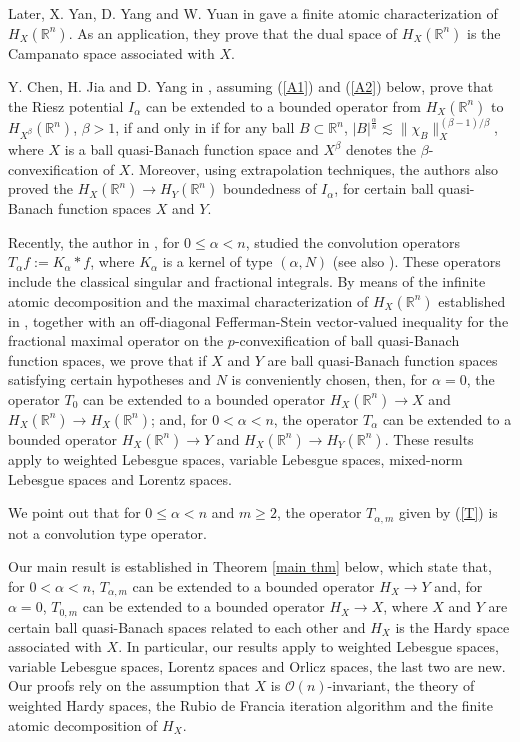 \documentclass[oneside,10pt]{article}
\begin{document}
Later, X. Yan, D. Yang and W. Yuan in \cite{Yan} gave a finite atomic characterization of $H_X(\mathbb{R}^n)$. As an
application, they prove that the dual space of $H_X(\mathbb{R}^n)$ is the Campanato space associated with $X$.


Y. Chen, H. Jia and D. Yang in \cite{YChen}, assuming (\ref{A1}) and (\ref{A2}) below, prove that the Riesz potential 
$I_{\alpha}$ can be extended to a bounded operator from $H_X(\mathbb{R}^n)$ to $H_{X^{\beta}}(\mathbb{R}^n)$, $\beta > 1$, if and only in  if 
for any ball $B \subset \mathbb{R}^n$, $|B|^{\frac{\alpha}{n}} \lesssim \| \chi_B \|_{X}^{(\beta-1)/\beta}$, where $X$ is a ball quasi-Banach function space and $X^{\beta}$ denotes the $\beta$-convexification of $X$. Moreover, using extrapolation techniques, the authors also proved the $H_X(\mathbb{R}^n) \to H_Y(\mathbb{R}^n)$ boundedness of $I_{\alpha}$, for certain ball quasi-Banach function spaces $X$ and $Y$.


Recently, the author in \cite{Rocha2025}, for $0 \leq \alpha < n$, studied the convolution operators $T_{\alpha}f := K_{\alpha} \ast f$, 
where $K_{\alpha}$ is a kernel of type $(\alpha, N)$ (see also \cite{Folland}). These operators include the classical singular and 
fractional integrals. By means of the infinite atomic decomposition and the maximal characterization of $H_X(\mathbb{R}^n)$ established in 
\cite{sawa}, together with an off-diagonal Fefferman-Stein vector-valued inequality for the fractional maximal operator on the 
$p$-convexification of ball quasi-Banach function spaces, we prove that if $X$ and $Y$ are ball quasi-Banach function spaces satisfying certain hypotheses and $N$ is conveniently chosen, then, for $\alpha = 0$, the operator $T_0$ can be extended to a bounded operator 
$H_{X}(\mathbb{R}^n) \to X$ and $H_{X}(\mathbb{R}^n) \to H_{X}(\mathbb{R}^n)$; and, for $0 < \alpha < n$, the operator $T_{\alpha}$ can 
be extended to a bounded operator $H_{X}(\mathbb{R}^n) \to Y$ and $H_{X}(\mathbb{R}^n) \to H_{Y}(\mathbb{R}^n)$. These results apply to weighted Lebesgue spaces, variable Lebesgue spaces, mixed-norm Lebesgue spaces and Lorentz spaces.
 

We point out that for $0 \leq \alpha < n$ and $m \geq 2$, the operator $T_{\alpha, m}$ given by (\ref{T}) is not a convolution type operator.


Our main result is established in Theorem \ref{main thm} below, which state that, for $0 < \alpha < n$, $T_{\alpha, m}$ can be extended to a bounded operator $H_X \to Y$ and, for $\alpha = 0$, $T_{0, m}$ can be extended to a bounded operator $H_X \to X$, where $X$ and $Y$ are certain ball quasi-Banach spaces related to each other and $H_X$ is the Hardy space associated with $X$. In particular, our results apply to weighted Lebesgue spaces, variable Lebesgue spaces, Lorentz spaces and Orlicz spaces, the last two are new. Our proofs rely on the assumption that $X$ is $\mathcal{O}(n)$-invariant, the theory of weighted Hardy spaces, the Rubio de Francia iteration algorithm and the finite atomic decomposition of $H_X$.
\end{document}
